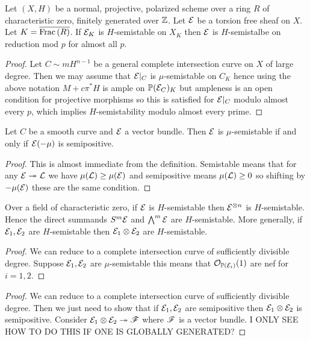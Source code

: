 \documentclass[12pt]{article}
\begin{document}
\begin{cor}
Let $(X, H)$ be a normal, projective, polarized scheme over a ring $R$ of characteristic zero, finitely generated over $\mathbb{Z}$. Let $\mathcal{E}$ be a torsion free sheaf on $X$. Let $K = \overline{\mathrm{Frac}\left(R\right)}$. If $\mathcal{E}_K$ is $H$-semistable on $X_K$ then $\mathcal{E}$ is $H$-semistalbe on reduction mod $p$ for almost all $p$.
\end{cor}

\begin{proof}
Let $C \sim m H^{n-1}$ be a general complete intersection curve on $X$ of large degree. Then we may assume that $\mathcal{E}|_C$ is $\mu$-semistable on $C_K$ hence using the above notation $M + c \pi^* H$ is ample on $\mathbb{P}(\mathcal{E}_C)_K$ but ampleness is an open condition for projective morphisms so this is satisfied for $\mathcal{E}|_C$ modulo almost every $p$, which implies $H$-semistability modulo almost every prime. 
\end{proof}

\begin{lemma}
Let $C$ be a smooth curve and $\mathcal{E}$ a vector bundle. Then $\mathcal{E}$ is $\mu$-semistable if and only if $\mathcal{E}(-\mu)$ is semipositive.
\end{lemma}

\begin{proof}
This is almost immediate from the definition. Semistable means that for any $\mathcal{E} \twoheadrightarrow \mathcal{L}$ we have $\mu(\mathcal{L}) \ge \mu(\mathcal{E})$ and semipositive means $\mu(\mathcal{L}) \ge 0$ so shifting by $- \mu(\mathcal{E})$ these are the same condition. 
\end{proof}

\begin{cor}
Over a field of characteristic zero, if $\mathcal{E}$ is $H$-semistable then $\mathcal{E}^{\otimes n}$ is $H$-semistable. Hence the direct summands $S^m \mathcal{E}$ and $\bigwedge^m \mathcal{E}$ are $H$-semistable. More generally, if $\mathcal{E}_1, \mathcal{E}_2$ are $H$-semistable then $\mathcal{E}_1 \otimes \mathcal{E}_2$ are $H$-semistable. 
\end{cor}

\begin{proof}
We can reduce to a complete intersection curve of sufficiently divisible degree. Suppose $\mathcal{E}_1, \mathcal{E}_2$ are $\mu$-semistable this means that $\mathcal{O}_{\mathbb{P}(\mathcal{E}_i)}(1)$ are nef for $i = 1,2$.
\end{proof}

\begin{cor}

\end{cor}

\begin{proof}
We can reduce to a complete intersection curve of sufficiently divisible degree. 
Then we just need to show that if $\mathcal{E}_1, \mathcal{E}_2$ are semipositive then $\mathcal{E}_1 \otimes \mathcal{E}_2$ is semipositive. Consider $\mathcal{E}_1 \otimes \mathcal{E}_2 \twoheadrightarrow \mathscr{F}$ where $\mathscr{F}$ is a vector bundle. {\color{red} I ONLY SEE HOW TO DO THIS IF ONE IS GLOBALLY GENERATED?}
\end{proof}
\end{document}

